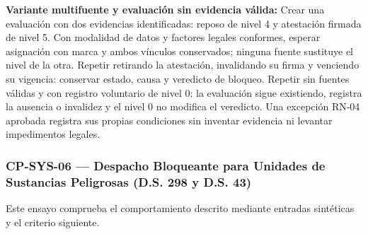 \par\noindent\textbf{Variante multifuente y evaluación sin evidencia válida:} Crear una evaluación con dos evidencias identificadas: reposo de nivel 4 y atestación firmada de nivel 5. Con modalidad de datos y factores legales conformes, esperar asignación con marca y ambos vínculos conservados; ninguna fuente sustituye el nivel de la otra. Repetir retirando la atestación, invalidando su firma y venciendo su vigencia: conservar estado, causa y veredicto de bloqueo. Repetir sin fuentes válidas y con registro voluntario de nivel 0: la evaluación sigue existiendo, registra la ausencia o invalidez y el nivel 0 no modifica el veredicto. Una excepción RN-04 aprobada registra sus propias condiciones sin inventar evidencia ni levantar impedimentos legales.\par


\subsubsection*{CP-SYS-06 — Despacho Bloqueante para Unidades de Sustancias Peligrosas (D.S. 298 y D.S. 43)}\label{sec:9-cp-sys-06}
Este ensayo comprueba el comportamiento descrito mediante entradas sintéticas y el criterio siguiente.

